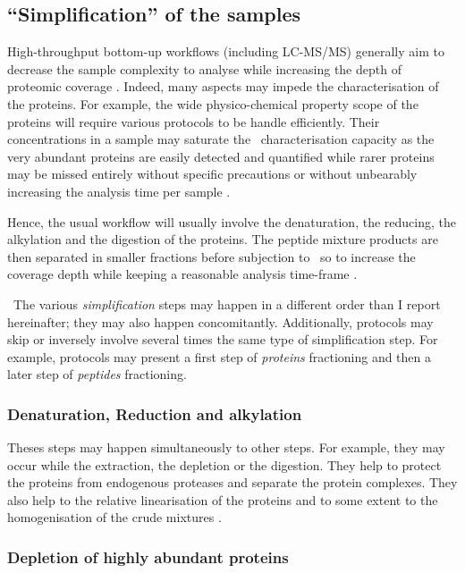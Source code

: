 \subsection{\enquote{Simplification} of the samples}

High-throughput bottom-up workflows (including \gls{LC-MS/MS}) generally
aim to decrease the sample complexity to analyse while increasing the depth
of proteomic coverage . Indeed,
many aspects may impede the characterisation of the proteins.
For example, the wide physico-chemical property scope of the proteins will
require various protocols to be handle efficiently.
Their concentrations in a sample may saturate the \ms\ characterisation capacity
as the very abundant proteins are easily detected and quantified while rarer
proteins may be missed entirely without specific precautions
 or without unbearably increasing the
analysis time per sample .

Hence, the usual workflow will usually involve the denaturation, the reducing,
the alkylation and the digestion of the proteins. The peptide mixture products
are then separated in smaller fractions before subjection to \ms\ so to increase
the coverage depth while keeping a reasonable analysis time-frame
.

\NB\ The various \emph{simplification} steps may happen in a different order
than I report hereinafter; they may also happen concomitantly. Additionally,
protocols may skip or inversely involve several times the same type of
simplification step. For example, protocols may present a first step of
\emph{proteins} fractioning and then a later step of \emph{peptides} fractioning.

\subsubsection{Denaturation, Reduction and alkylation}

Theses steps may happen simultaneously to other steps. For example, they may
occur while the extraction, the depletion or the digestion. They help to protect
the proteins from endogenous proteases and separate the protein complexes. They
also help to the relative linearisation of the proteins and to some extent to
the homogenisation of the crude mixtures .

\subsubsection{Depletion of highly abundant proteins}

